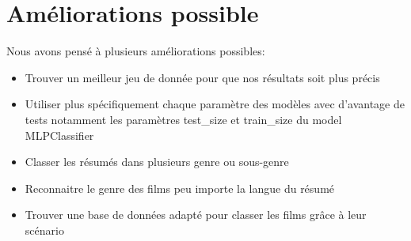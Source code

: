 \section{Améliorations possible}
Nous avons pensé à plusieurs améliorations possibles:
\begin{itemize}
    \item Trouver un meilleur jeu de donnée pour que nos résultats soit plus précis
    \item Utiliser plus spécifiquement chaque paramètre des modèles avec d'avantage de tests notamment les paramètres test\_size et train\_size du model MLPClassifier
    \item Classer les résumés dans plusieurs genre ou sous-genre
    \item Reconnaitre le genre des films peu importe la langue du résumé
    \item Trouver une base de données adapté pour classer les films grâce à leur scénario

\end{itemize}
